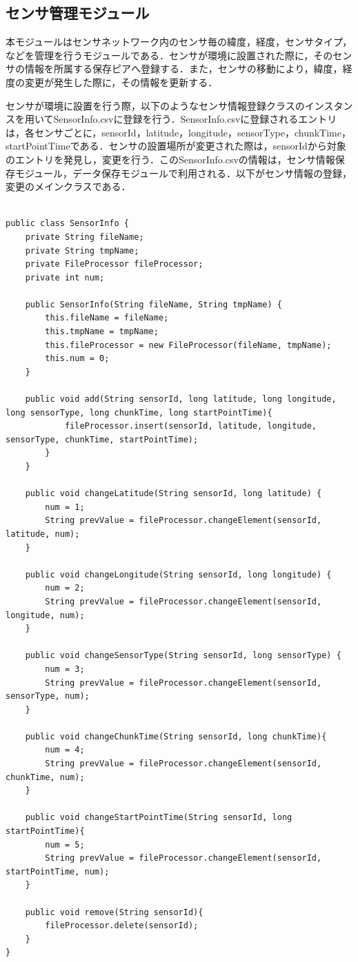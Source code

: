 \subsection{センサ管理モジュール}
本モジュールはセンサネットワーク内のセンサ毎の緯度，経度，センサタイプ，などを管理を行うモジュールである．センサが環境に設置された際に，そのセンサの情報を所属する保存ピアへ登録する．また，センサの移動により，緯度，経度の変更が発生した際に，その情報を更新する．

センサが環境に設置を行う際，以下のようなセンサ情報登録クラスのインスタンスを用いてSensorInfo.csvに登録を行う．SensorInfo.csvに登録されるエントリは，各センサごとに，sensorId，latitude，longitude，sensorType，chunkTime，startPointTimeである．センサの設置場所が変更された際は，sensorIdから対象のエントリを発見し，変更を行う．このSensorInfo.csvの情報は，センサ情報保存モジュール，データ保存モジュールで利用される．以下がセンサ情報の登録，変更のメインクラスである．
\begin{lstlisting}[caption=センサ情報の保存，変更]

public class SensorInfo {
	private String fileName;
	private String tmpName;
	private FileProcessor fileProcessor;
	private int num;
	
	public SensorInfo(String fileName, String tmpName) {
		this.fileName = fileName;
		this.tmpName = tmpName;
		this.fileProcessor = new FileProcessor(fileName, tmpName);
		this.num = 0;
	}

	public void add(String sensorId, long latitude, long longitude, long sensorType, long chunkTime, long startPointTime){
			fileProcessor.insert(sensorId, latitude, longitude, sensorType, chunkTime, startPointTime);
		}
	}
	
	public void changeLatitude(String sensorId, long latitude) {
		num = 1;
		String prevValue = fileProcessor.changeElement(sensorId, latitude, num);
	}

	public void changeLongitude(String sensorId, long longitude) {
		num = 2;
		String prevValue = fileProcessor.changeElement(sensorId, longitude, num);
	}

	public void changeSensorType(String sensorId, long sensorType) {
		num = 3;
		String prevValue = fileProcessor.changeElement(sensorId, sensorType, num);
	}
	
	public void changeChunkTime(String sensorId, long chunkTime){
		num = 4;
		String prevValue = fileProcessor.changeElement(sensorId, chunkTime, num);
	}
	
	public void changeStartPointTime(String sensorId, long startPointTime){
		num = 5;
		String prevValue = fileProcessor.changeElement(sensorId, startPointTime, num);
	}	

	public void remove(String sensorId){
		fileProcessor.delete(sensorId);
	}
}
 
\end{lstlisting}
\fi

